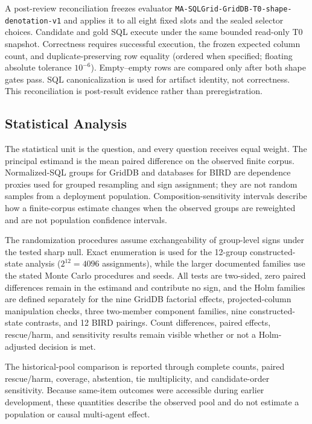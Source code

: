 \documentclass[applsci,article,submit,moreauthors]{Definitions/mdpi}
\begin{document}
A post-review reconciliation freezes evaluator \nolinkurl{MA-SQLGrid-GridDB-T0-shape-denotation-v1} and applies it to all eight fixed slots and the sealed selector choices. Candidate and gold SQL execute under the same bounded read-only T0 snapshot. Correctness requires successful execution, the frozen expected column count, and duplicate-preserving row equality (ordered when specified; floating absolute tolerance $10^{-6}$). Empty--empty rows are compared only after both shape gates pass. SQL canonicalization is used for artifact identity, not correctness. This reconciliation is post-result evidence rather than preregistration.

\subsection{Statistical Analysis}

The statistical unit is the question, and every question receives equal weight. The principal estimand is the mean paired difference on the observed finite corpus. Normalized-SQL groups for GridDB and databases for BIRD are dependence proxies used for grouped resampling and sign assignment; they are not random samples from a deployment population. Composition-sensitivity intervals describe how a finite-corpus estimate changes when the observed groups are reweighted and are not population confidence intervals.

The randomization procedures assume exchangeability of group-level signs under the tested sharp null. Exact enumeration is used for the 12-group constructed-state analysis ($2^{12}=4096$ assignments), while the larger documented families use the stated Monte Carlo procedures and seeds. All tests are two-sided, zero paired differences remain in the estimand and contribute no sign, and the Holm families are defined separately for the nine GridDB factorial effects, projected-column manipulation checks, three two-member component families, nine constructed-state contrasts, and 12 BIRD pairings. Count differences, paired effects, rescue/harm, and sensitivity results remain visible whether or not a Holm-adjusted decision is met.

The historical-pool comparison is reported through complete counts, paired rescue/harm, coverage, abstention, tie multiplicity, and candidate-order sensitivity. Because same-item outcomes were accessible during earlier development, these quantities describe the observed pool and do not estimate a population or causal multi-agent effect.
\end{document}
